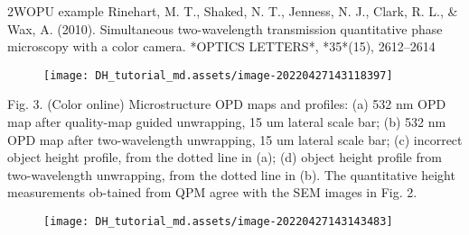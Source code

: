 \documentclass[t, aspectratio=169]{beamer}
\begin{document}




\begin{frame}[allowframebreaks]{2WOPU example}
Rinehart, M. T., Shaked, N. T., Jenness, N. J., Clark, R. L., \& Wax, A. (2010). Simultaneous two-wavelength transmission quantitative phase microscopy with a color camera. *OPTICS LETTERS*, *35*(15), 2612–2614
	\begin{figure}
		\texttt{[image: DH\_tutorial\_md.assets/image-20220427143118397]}
	\end{figure}
Fig. 3. (Color online) Microstructure OPD maps and profiles: (a) 532 nm OPD map after quality-map guided unwrapping, 15 um lateral scale bar; (b) 532 nm OPD map after two-wavelength unwrapping, 15 um lateral scale bar; (c) incorrect object height profile, from the dotted line in (a); (d) object height profile from two-wavelength unwrapping, from the dotted line in (b). The quantitative height measurements ob-tained from QPM agree with the SEM images in Fig. 2.
	\begin{figure}
		\texttt{[image: DH\_tutorial\_md.assets/image-20220427143143483]}
	\end{figure}
\end{frame}
\end{document}
